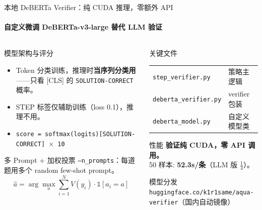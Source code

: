 \documentclass[10pt,aspectratio=169]{beamer}
\newcommand{\tightitems}{\setlength{\itemsep}{0.24em}}
\begin{document}
\begin{frame}{本地 DeBERTa Verifier：纯 CUDA 推理，零额外 API}
  \framesubtitle{自定义微调 DeBERTa-v3-large 替代 LLM 验证}
  \small
  \begin{columns}[T,onlytextwidth]
    \begin{column}{0.52\textwidth}
      \begin{block}{模型架构与评分}
        \footnotesize
        \begin{itemize}
          \tightitems
          \item Token 分类训练，推理时\textbf{当序列分类用}——只看 [CLS] 的 \texttt{SOLUTION-CORRECT} 概率。
          \item STEP 标签仅辅助训练（loss 0.1），推理不用。
          \item \texttt{score = softmax(logits)[SOLUTION-CORRECT] $\times$ 10}
        \end{itemize}
      \end{block}
      \begin{block}{多 Prompt + 加权投票}
        \footnotesize
        \texttt{--n\_prompts}：每道题用多个 random few-shot prompt。
        \[
          \hat{a} = \arg\max_{a} \sum_{i=1}^{N} V(y_i) \cdot \mathbb{1}[a_i = a]
        \]
      \end{block}
    \end{column}
    \begin{column}{0.44\textwidth}
      \begin{block}{关键文件}
        \footnotesize
        \begin{tabularx}{\linewidth}{lY}
          \midrule
          \texttt{step\_verifier.py} & 策略主逻辑 \\
          \texttt{deberta\_verifier.py} & verifier 包装 \\
          \texttt{deberta\_model.py} & 自定义模型类 \\
          \bottomrule
        \end{tabularx}
      \end{block}
      \begin{alertblock}{性能}
        \textbf{验证纯 CUDA，零 API 调用。}\\
        50 样本: \textbf{52.3s/条}（LLM 版 $\frac{1}{4}$）。
      \end{alertblock}
      \begin{block}{模型分发}
        \footnotesize
        \centering
        \texttt{huggingface.co/k1r1same/aqua-verifier}（国内自动镜像）
      \end{block}
    \end{column}
  \end{columns}
\end{frame}
\end{document}
